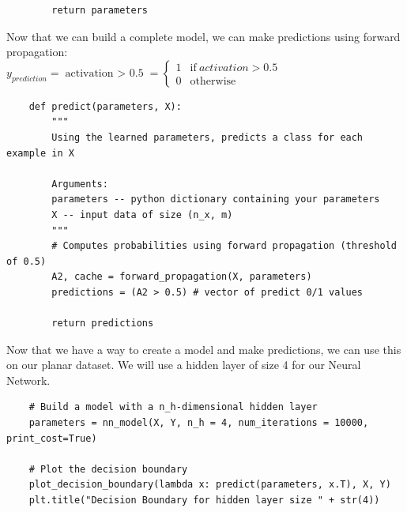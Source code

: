 \documentclass[11pt, a4paper]{article}
\begin{document}
\begin{spacing}{1.1}
\begin{lstlisting}
		return parameters \end{lstlisting}
	Now that we can build a complete model, we can make predictions using forward propagation: \vspace*{1mm} \\
	\hspace*{30mm} $y_{prediction} = \text{{activation $>$ 0.5}} = \begin{cases}
	1 & \text{if}\ activation > 0.5 \\
	0 & \text{otherwise}
	\end{cases}$  
	\begin{lstlisting}
	def predict(parameters, X):
		"""
		Using the learned parameters, predicts a class for each example in X
		
		Arguments:
		parameters -- python dictionary containing your parameters 
		X -- input data of size (n_x, m)
		"""
		# Computes probabilities using forward propagation (threshold of 0.5)
		A2, cache = forward_propagation(X, parameters)
		predictions = (A2 > 0.5) # vector of predict 0/1 values
		
		return predictions \end{lstlisting}
	Now that we have a way to create a model and make predictions, we can use this on our planar dataset. We will use a hidden layer of size  4 for our Neural Network. \newpage

	\begin{lstlisting}
	# Build a model with a n_h-dimensional hidden layer
	parameters = nn_model(X, Y, n_h = 4, num_iterations = 10000, print_cost=True)
	
	# Plot the decision boundary
	plot_decision_boundary(lambda x: predict(parameters, x.T), X, Y)
	plt.title("Decision Boundary for hidden layer size " + str(4)) 
	

\end{lstlisting}
\end{spacing}
\end{document}
